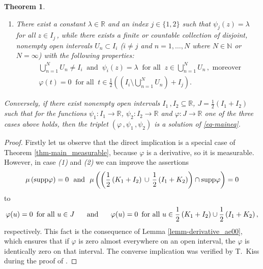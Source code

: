 \documentclass[12pt]{amsart}
\newtheorem{thm}{Theorem}
\theoremstyle{remark}
\theoremstyle{definition}
\newcommand{\NN}{\mathbb{N}}
\newcommand{\RR}{\mathbb{R}}
\newcommand{\supp}{\mbox{\rm supp}}
\newcommand{\map}{\longrightarrow}
\begin{document}
\begin{thm}
\begin{enumerate}
\item 
There exist a constant $ \lambda \in \RR $ 
and an index 
$ j \in \lbrace 1,2 \rbrace $ such that 
$ \psi_j(z) = \lambda $ for all $ z \in I_j \,$, 
while there exists a finite or countable collection of 
disjoint, nonempty open intervals 
$ U_n  \subset I_i $ 
($ i \neq j $ and $ n = 1, \dots, N $ 
where $ N \in \NN $ or $ N = \infty $) 
with the following properties: 
\begin{align*}
& \bigcup_{n=1}^N U_n \neq I_i 
\ \mbox{ and } \ \psi_i(z) = \lambda 
\ \mbox{ for all } \ z \in \bigcup_{n=1}^N U_n \,, 
\mbox{ moreover } \\  
& \varphi(t) = 0 \ \mbox{ for all } \ 
t \in \frac{1}{2} \left( 
\left( I_i \setminus \bigcup_{n=1}^N U_n \right) + I_j 
\right).  
\end{align*}
\end{enumerate} 
Conversely, if there exist nonempty open intervals 
$ I_1 \,, I_2 \subseteq \RR $, 
$ J = \frac{1}{2} \left( I_1 + I_2 \right) $ 
such that for the functions 
$ \psi_1 : I_1 \map \RR $, 
$ \psi_2 : I_2 \map \RR $ and 
$ \varphi : J \map \RR $ one 
of the three cases above holds, 
then the triplet 
$ \left( \varphi \,, \psi_1 \,, \psi_2 \right) $ 
is a solution of \eqref{eq-maineq}. 
\end{thm}

\begin{proof}
Firstly let us observe that the direct implication 
is a special case of Theorem \ref{thm-main_measurable}, 
because $\varphi$ is a derivative, so it is measurable. 
However, in case \emph{(1)} and \emph{(2)} we can 
improve the assertions 
\[
\mu \left( \supp \varphi \right) = 0 
\ \mbox{ and } \ 
\mu \left( \left( 
\frac{1}{2} \left( K_1 + I_2 \right) \, \cup \, 
\frac{1}{2} \left( I_1 + K_2 \right) \right)
\cap \supp  \varphi \right) = 0 
\]
to 
\[
\varphi(u) = 0 
\, \mbox{ for all }
u \in  J
\hspace{5mm} \mbox{ and } \hspace{5mm} 
\varphi(u) = 0 
\, \mbox{ for all }
u \in  
\frac{1}{2} \left( K_1 + I_2 \right) \cup 
\frac{1}{2} \left( I_1 + K_2 \right),
\]
respectively. This fact is the consequence 
of Lemma \ref{lemm-derivative_ae00}, which 
ensures that if 
$ \varphi $ is zero almost everywhere on an open interval, 
the $ \varphi $ is identically zero on that interval. 
The converse implication was verified by T.~Kiss during 
the proof of \cite[Theorem 6.]{Kis24}. 
\end{proof}
\end{document}
